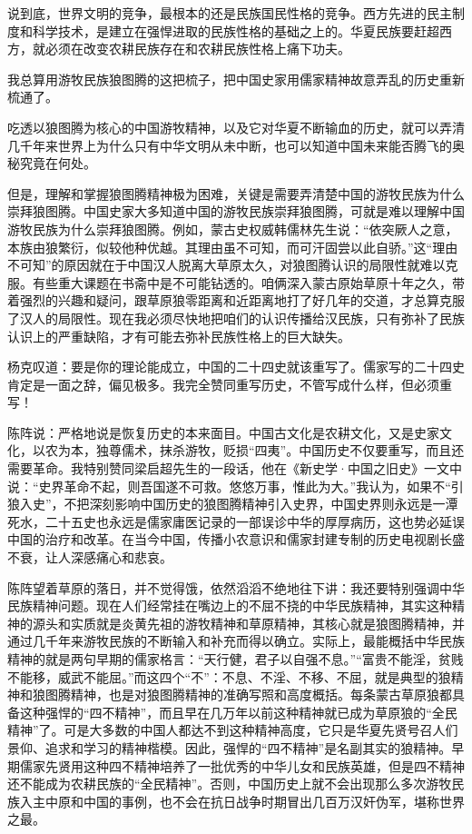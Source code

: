 \par 说到底，世界文明的竞争，最根本的还是民族国民性格的竞争。西方先进的民主制度和科学技术，是建立在强悍进取的民族性格的基础之上的。华夏民族要赶超西方，就必须在改变农耕民族存在和农耕民族性格上痛下功夫。
\par 我总算用游牧民族狼图腾的这把梳子，把中国史家用儒家精神故意弄乱的历史重新梳通了。
\par 吃透以狼图腾为核心的中国游牧精神，以及它对华夏不断输血的历史，就可以弄清几千年来世界上为什么只有中华文明从未中断，也可以知道中国未来能否腾飞的奥秘究竟在何处。
\par 但是，理解和掌握狼图腾精神极为困难，关键是需要弄清楚中国的游牧民族为什么崇拜狼图腾。中国史家大多知道中国的游牧民族崇拜狼图腾，可就是难以理解中国游牧民族为什么崇拜狼图腾。例如，蒙古史权威韩儒林先生说：“依突厥人之意，本族由狼繁衍，似较他种优越。其理由虽不可知，而可汗固尝以此自骄。”这“理由不可知”的原因就在于中国汉人脱离大草原太久，对狼图腾认识的局限性就难以克服。有些重大课题在书斋中是不可能钻透的。咱俩深入蒙古原始草原十年之久，带着强烈的兴趣和疑问，跟草原狼零距离和近距离地打了好几年的交道，才总算克服了汉人的局限性。现在我必须尽快地把咱们的认识传播给汉民族，只有弥补了民族认识上的严重缺陷，才有可能去弥补民族性格上的巨大缺失。
\par 杨克叹道：要是你的理论能成立，中国的二十四史就该重写了。儒家写的二十四史肯定是一面之辞，偏见极多。我完全赞同重写历史，不管写成什么样，但必须重写！
\par 陈阵说：严格地说是恢复历史的本来面目。中国古文化是农耕文化，又是史家文化，以农为本，独尊儒术，抹杀游牧，贬损“四夷”。中国历史不仅要重写，而且还需要革命。我特别赞同梁启超先生的一段话，他在《新史学·中国之旧史》一文中说：“史界革命不起，则吾国遂不可救。悠悠万事，惟此为大。”我认为，如果不“引狼入史”，不把深刻影响中国历史的狼图腾精神引入史界，中国史界则永远是一潭死水，二十五史也永远是儒家庸医记录的一部误诊中华的厚厚病历，这也势必延误中国的治疗和改革。在当今中国，传播小农意识和儒家封建专制的历史电视剧长盛不衰，让人深感痛心和悲哀。
\par 
\par 陈阵望着草原的落日，并不觉得饿，依然滔滔不绝地往下讲：我还要特别强调中华民族精神问题。现在人们经常挂在嘴边上的不屈不挠的中华民族精神，其实这种精神的源头和实质就是炎黄先祖的游牧精神和草原精神，其核心就是狼图腾精神，并通过几千年来游牧民族的不断输入和补充而得以确立。实际上，最能概括中华民族精神的就是两句早期的儒家格言：“天行健，君子以自强不息。”“富贵不能淫，贫贱不能移，威武不能屈。”而这四个“不”：不息、不淫、不移、不屈，就是典型的狼精神和狼图腾精神，也是对狼图腾精神的准确写照和高度概括。每条蒙古草原狼都具备这种强悍的“四不精神”，而且早在几万年以前这种精神就已成为草原狼的“全民精神”了。可是大多数的中国人都达不到这种精神高度，它只是华夏先贤号召人们景仰、追求和学习的精神楷模。因此，强悍的“四不精神”是名副其实的狼精神。早期儒家先贤用这种四不精神培养了一批优秀的中华儿女和民族英雄，但是四不精神还不能成为农耕民族的“全民精神”。否则，中国历史上就不会出现那么多次游牧民族入主中原和中国的事例，也不会在抗日战争时期冒出几百万汉奸伪军，堪称世界之最。
